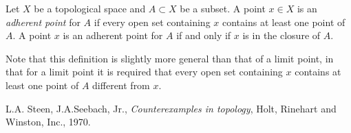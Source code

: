 \documentclass[12pt]{article}
\newcommand{\<}{\langle}
\renewcommand{\>}{\rangle}
\begin{document}
Let $X$ be a topological space and $A\subset X$ be a subset.  A point $x\in X$ is an \emph{adherent point} for $A$ if every open set containing $x$ contains at least one point of $A$.  A point $x$ is an adherent point for $A$ if and only if $x$ is in the closure of $A$.

Note that this definition is slightly more general than that of a limit point, in that for a limit point it is required that every open set containing $x$ contains at least one point of $A$ different from $x$.

\begin{thebibliography}{9}
 L.A. Steen, J.A.Seebach, Jr.,
\emph{Counterexamples in topology},
Holt, Rinehart and Winston, Inc., 1970.
\end{thebibliography}
\end{document}
